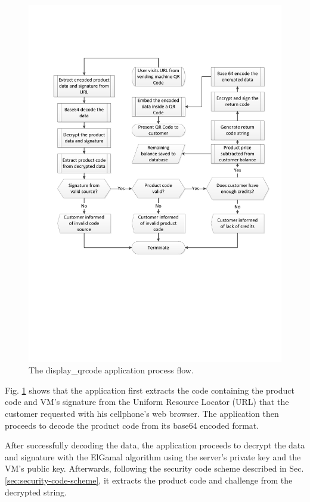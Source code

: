 \begin{figure}
 \centering 
 \includegraphics[clip=true, trim = 0 250 0 120,
 scale=0.7]{qrcode_processflow_server_bak}
 \caption{The display\_qrcode application process flow.} 
 \label{fig:disp-qrcode}
\end{figure}

Fig. \ref{fig:disp-qrcode} shows that the application first extracts the code
containing the product code and VM's signature from the Uniform
Resource Locator (URL) that the customer requested with his cellphone's web
browser. The application then proceeds to decode the product code from its base64
encoded format.

After successfully decoding the data, the application proceeds to decrypt the data and
signature with the ElGamal algorithm using the server's private key and the
VM's public key. Afterwards, following the security code scheme described in Sec.
\ref{sec:security-code-scheme}, it extracts the product code and challenge from the
decrypted string.


